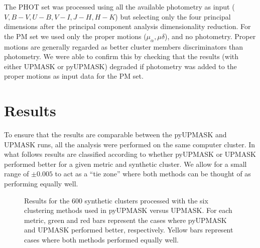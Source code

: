 \documentclass{aa}
\begin{document}

 The PHOT set was processed using all the available photometry as input ($V,
 B-V, U-B, V-I, J-H, H-K$) but selecting only the four principal dimensions
 after the principal component analysis dimensionality reduction.
 For the PM set we used only the proper motions ($\mu_{\alpha}, \mu{\delta}$),
 and no photometry. Proper motions are generally regarded as better cluster
 members discriminators than photometry. We were able to confirm this by
 checking that the results (with either UPMASK or pyUPMASK) degraded if
 photometry was added to the proper motions as input data for the PM set.




\section{Results}
 \label{sec:results}

 To ensure that the results are comparable between the pyUPMASK and UPMASK runs,
 all the analysis were performed on the same computer cluster. In what follows
 results are classified according to whether pyUPMASK or UPMASK performed
 better for a given metric and synthetic cluster.
 We allow for a small range of $\pm0.005$ to act as a ``tie zone''
 where both methods can be thought of as performing equally well.\\

 \begin{figure}
 \caption{Results for the 600 synthetic clusters processed with the six
 clustering methods used in pyUPMASK versus UPMASK. For each metric, green and
 red bars represent the cases where pyUPMASK and UPMASK performed better,
 respectively. Yellow bars represent cases where both methods performed
 equally well.}
 \label{fig:allmethods}
 \end{figure}
\end{document}
